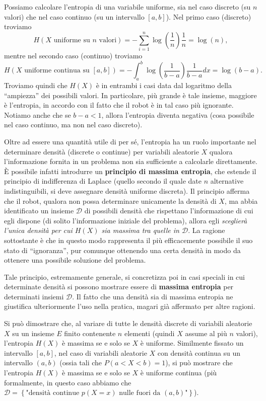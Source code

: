 \documentclass[
  italian,
  letterpaper,
]{book}
\newcommand{\bra}[1]{\left( #1 \right)}
\newcommand{\cur}[1]{\left\{ #1 \right\}}
\theoremstyle{definition}
\theoremstyle{remark}
\begin{document}
Possiamo calcolare l'entropia di una variabile uniforme, sia nel caso
discreto (su \(n\) valori) che nel caso continuo (su un intervallo
\([a,b]\)). Nel primo caso (discreto) troviamo
\[ H( X \text{ uniforme su $n$ valori})  = -\sum_{i=1}^n \log\bra{ \frac 1 n } \frac 1 n = \log(n),\]
mentre nel secondo caso (continuo) troviamo
\[ H(X \text{ uniforme continua su $[a,b]$}) = - \int_a^b \log\bra{ \frac  1 {b-a}} \frac 1 {b-a} dx = \log(b-a).\]
Troviamo quindi che \(H(X)\) è in entrambi i casi data dal logaritmo
della ``ampiezza'' dei possibili valori. In particolare, più grande è
tale insieme, maggiore è l'entropia, in accordo con il fatto che il
robot è in tal caso più ignorante. Notiamo anche che se \(b-a<1\),
allora l'entropia diventa negativa (cosa possibile nel caso continuo, ma
non nel caso discreto).

Oltre ad essere una quantità utile di per sé, l'entropia ha un ruolo
importante nel determinare densità (discrete o continue) per variabili
aleatorie \(X\) qualora l'informazione fornita in un problema non sia
sufficiente a calcolarle direttamente. È possibile infatti introdurre un
\textbf{principio di massima entropia}, che estende il principio di
indifferenza di Laplace (quello secondo il quale date \(n\) alternative
indistinguibili, si deve assegnare densità uniforme discreta). Il
principio afferma che il robot, qualora non possa determinare unicamente
la densità di \(X\), ma abbia identificato un insieme \(\mathcal{D}\) di
possibili densità che rispettano l'informazione di cui egli dispone (di
solito l'informazione iniziale del problema), allora egli
\emph{sceglierà l'unica densità per cui \(H(X)\) sia massima tra quelle
in \(\mathcal{D}\)}. La ragione sottostante è che in questo modo
rappresenta il più efficacemente possibile il suo stato di
``ignoranza'', pur comunque ottenendo una certa densità in modo da
ottenere una possibile soluzione del problema.

Tale principio, estremamente generale, si concretizza poi in casi
speciali in cui determinate densità si possono mostrare essere di
\textbf{massima entropia} per determinati insiemi \(\mathcal{D}\). Il
fatto che una densità sia di massima entropia ne giustifica
ulteriormente l'uso nella pratica, magari già affermato per altre
ragioni.

Si può dimostrare che, al variare di tutte le densità discrete di
variabili aleatorie \(X\) su un insieme \(E\) finito contenente \(n\)
elementi (quindi \(X\) assume al più \(n\) valori), l'entropia \(H(X)\)
è massima se e solo se \(X\) è uniforme. Similmente fissato un
intervallo \([a,b]\), nel caso di variabili aleatorie \(X\) con densità
continua su un intervallo \((a,b)\) (ossia tali che \(P(a<X<b )=1\)), si
può mostrare che l'entropia \(H(X)\) è massima se e solo se \(X\) è
uniforme continua (più formalmente, in questo caso abbiamo che
\(\mathcal{D} = \cur{ \text{"densità continue $p(X=x)$ nulle fuori da $(a,b)$"}}\)).
\end{document}
